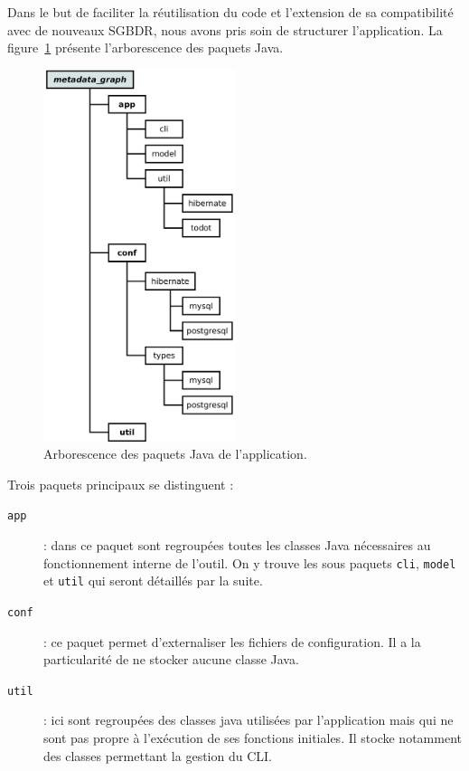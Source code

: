 Dans le but de faciliter la réutilisation du code et l'extension de sa compatibilité avec de nouveaux SGBDR, nous avons pris soin de structurer l'application. La figure~\ref{figure:structure_appli} présente l'arborescence des paquets Java.

\begin{figure}[H]
\centering
\includegraphics[width=0.5\textwidth]{files/archi}
\caption{Arborescence des paquets Java de l'application.}
\label{figure:structure_appli}
\end{figure}

Trois paquets principaux se distinguent :

\begin{description}
\item[\texttt{app}] : dans ce paquet sont regroupées toutes les classes Java nécessaires au fonctionnement interne de l'outil. On y trouve les sous paquets \texttt{cli}, \texttt{model} et \texttt{util} qui seront détaillés par la suite.
\item[\texttt{conf}] : ce paquet permet d'externaliser les fichiers de configuration. Il a la particularité de ne stocker aucune classe Java.
\item[\texttt{util}] : ici sont regroupées des classes java utilisées par l'application mais qui ne sont pas propre à l'exécution de ses fonctions initiales. Il stocke notamment des classes permettant la gestion du CLI.
\end{description}

